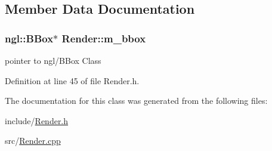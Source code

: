 \subsection{Member Data Documentation}
\hypertarget{class_render_a5e571da11a215f0eee9b0f44f2a77fb4}{
\subsubsection[{m\_\-bbox}]{\setlength{\rightskip}{0pt plus 5cm}ngl::BBox$\ast$ {\bf Render::m\_\-bbox}}}
\label{class_render_a5e571da11a215f0eee9b0f44f2a77fb4}


pointer to ngl/BBox Class 



Definition at line 45 of file Render.h.



The documentation for this class was generated from the following files:\begin{DoxyCompactItemize}
\item 
include/\hyperlink{_render_8h}{Render.h}\item 
src/\hyperlink{_render_8cpp}{Render.cpp}\end{DoxyCompactItemize}
